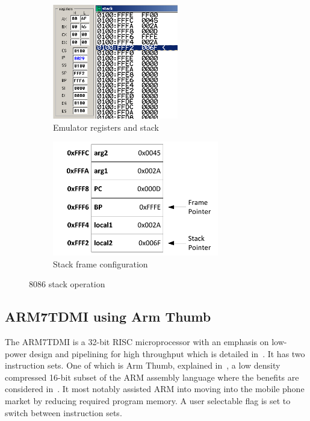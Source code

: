 \documentclass[12pt,a4paper]{article}
\begin{document}
\begin{figure}[htb]
        \centering
        \begin{subfigure}[b]{0.5\textwidth}
                \includegraphics[height=5cm]{Figures/emu.png}
                \caption{Emulator registers and stack}
                \label{fig:emu}
        \end{subfigure}%
        \begin{subfigure}[b]{0.5\textwidth}
                \includegraphics[height=5cm]{Figures/stack.pdf}
                \caption{Stack frame configuration}
                \label{fig:stack}
        \end{subfigure}
        \caption{8086 stack operation}
        \label{fig:8086}
\end{figure}







\subsection{ARM7TDMI using Arm Thumb}
The ARM7TDMI is a 32-bit RISC microprocessor with an emphasis on low-power design and pipelining for high throughput which is detailed in~\cite{ARM7TDMI}.
It has two instruction sets. 
One of which is Arm Thumb, explained in~\cite{arm}, a low density compressed 16-bit subset of the ARM assembly language where the benefits are considered in~\cite{ARMs}.
It most notably assisted ARM into moving into the mobile phone market by reducing required program memory. 
A user selectable flag is set to switch between instruction sets.
\end{document}
